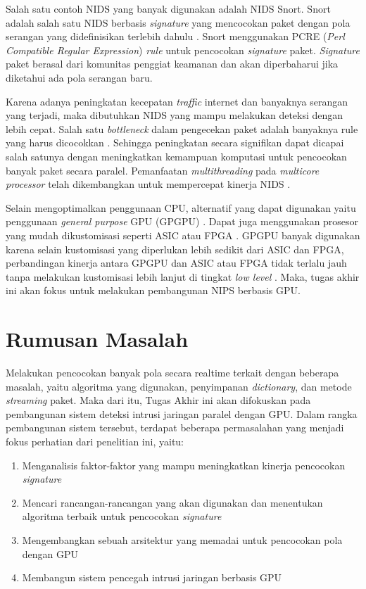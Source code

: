   Salah satu contoh NIDS yang banyak digunakan adalah NIDS Snort. Snort adalah salah satu NIDS berbasis \emph{signature} yang mencocokan paket dengan pola serangan yang didefinisikan terlebih dahulu \parencite{snort}. Snort menggunakan PCRE (\emph{Perl Compatible Regular Expression}) \emph{rule} untuk pencocokan \emph{signature} paket. \emph{Signature} paket berasal dari komunitas penggiat keamanan dan akan diperbaharui jika diketahui ada pola serangan baru.

  Karena adanya peningkatan kecepatan \emph{traffic} internet dan banyaknya serangan yang terjadi, maka dibutuhkan NIDS yang mampu melakukan deteksi dengan lebih cepat. Salah satu \emph{bottleneck} dalam pengecekan paket adalah banyaknya rule yang harus dicocokkan \parencite{pcre2007}. Sehingga peningkatan secara signifikan dapat dicapai salah satunya dengan meningkatkan kemampuan komputasi untuk pencocokan banyak paket secara paralel. Pemanfaatan \emph{multithreading} pada \emph{multicore processor} telah dikembangkan untuk mempercepat kinerja NIDS \parencite{multi2004}.

  Selain mengoptimalkan penggunaan CPU, alternatif yang dapat digunakan yaitu penggunaan \emph{general purpose} GPU (GPGPU) \parencite{4482891}. Dapat juga menggunakan prosesor yang mudah dikustomisasi seperti ASIC atau FPGA \parencite{fpga2008}. GPGPU banyak digunakan karena selain kustomisasi yang diperlukan lebih sedikit dari ASIC dan FPGA, perbandingan kinerja antara GPGPU dan ASIC atau FPGA tidak terlalu jauh tanpa melakukan kustomisasi lebih lanjut di tingkat \emph{low level} \parencite{gnort2008}. Maka, tugas akhir ini akan fokus untuk melakukan pembangunan NIPS berbasis GPU.

\section{Rumusan Masalah}

  Melakukan pencocokan banyak pola secara realtime terkait dengan beberapa masalah, yaitu algoritma yang digunakan, penyimpanan \emph{dictionary}, dan metode \emph{streaming} paket. Maka dari itu, Tugas Akhir ini akan difokuskan pada pembangunan sistem deteksi intrusi jaringan paralel dengan GPU. Dalam rangka pembangunan sistem tersebut, terdapat beberapa permasalahan yang menjadi fokus perhatian dari penelitian ini, yaitu: \\
  \begin{enumerate}
      \item Menganalisis faktor-faktor yang mampu meningkatkan kinerja pencocokan \emph{signature}
      \item Mencari rancangan-rancangan yang akan digunakan dan menentukan algoritma terbaik untuk pencocokan \emph{signature}
      \item Mengembangkan sebuah arsitektur yang memadai untuk pencocokan pola dengan GPU
      \item Membangun sistem pencegah intrusi jaringan berbasis GPU
  \end{enumerate}

